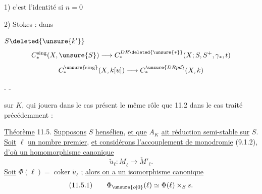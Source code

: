 1) c'est l'identité si $n=0$

2) Stokes :  dans


$S\deleted{\unsure{k'}}$
\[
 C_*^{\mathrm{sing}}(X,\unsure{S})\longrightarrow
 C_*^{DR\deleted{\unsure{*}}}(X;S,S^+,\gamma_*,t)
\]
\[
 C_*^{\unsure{\mathrm{sing}}}(X,k[u])\longrightarrow C_*^{\unsure{DRpd}}(X,k)
\]

\begin{center}-  -\end{center}

sur $K$, qui jouera dans le cas présent le même rôle que 11.2 dans le cas traité précédemment :

\uline{Théorème} 11.5. \uline{Supposons} $S$ \uline{hensélien}, \uline{et que} $A_K$ \uline{ait réduction semi-stable sur} $S$. \uline{Soit} $\ell$ \uline{un nombre premier}, \uline{et considérons l'accouplement de monodromie} (9.1.2), \uline{d'où un homomorphisme canonique}
\[
 \widetilde u_\ell:\underline M_\ell\longrightarrow\check{\underline M}'_\ell.
\]
\uline{Soit} $\Phi(\ell)=\operatorname{coker}\widetilde u_\ell$ ; \uline{alors on a un isomorphisme canonique}
\[
(11.5.1)\qquad\Phi_{\unsure{o|0}}(\ell)\simeq\Phi(\ell)\times_Ss.
\]

